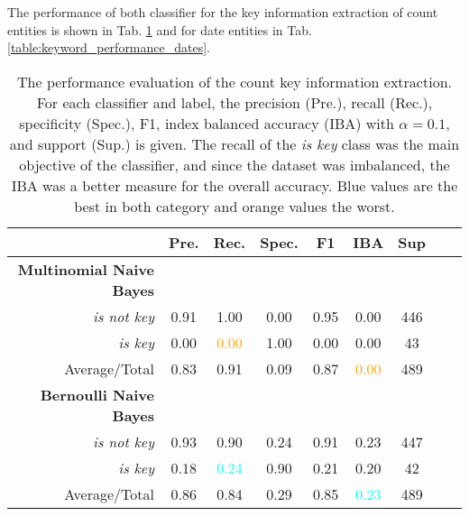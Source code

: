   The performance of both classifier for the key information extraction of count entities is shown in Tab. \ref{table:keyword_performance_counts} and for date entities in Tab. \ref{table:keyword_performance_dates}.
  \begin{table}[h!]
    \caption{The performance evaluation of the count key information extraction. For each classifier and label, the precision (Pre.), recall (Rec.), specificity (Spec.), F1, index balanced accuracy (IBA) with $\alpha = 0.1$, and support (Sup.) is given. The recall of the \textsl{is key} class was the main objective of the classifier, and since the dataset was imbalanced, the IBA was a better measure for the overall accuracy. Blue values are the best in both category and orange values the worst.}
    \centering
    \begin{tabular}{@{}rcccccccc@{}}
      \toprule
       & \textbf{Pre.} & \textbf{Rec.} & \textbf{Spec.}
      & \textbf{F1} & \textbf{IBA}& \textbf{Sup} \\
      \midrule
      \textbf{Multinomial Naive Bayes}\\
      \textsl{is not key}& 0.91& 1.00& 0.00& 0.95& 0.00& 446 \\
      \textsl{is key}& 0.00& \textcolor{orange}{0.00}& 1.00& 0.00& 0.00& 43 \\
      Average/Total& 0.83& 0.91& 0.09& 0.87& \textcolor{orange}{0.00}& 489 \vspace{2mm}\\
      \textbf{Bernoulli Naive Bayes}\\
      \textsl{is not key}& 0.93& 0.90& 0.24& 0.91& 0.23& 447 \\
      \textsl{is key}& 0.18& \textcolor{cyan}{0.24}& 0.90& 0.21& 0.20& 42 \\
      Average/Total& 0.86& 0.84& 0.29& 0.85& \textcolor{cyan}{0.23}& 489 \vspace{2mm}\\
      \bottomrule
    \end{tabular}
  \label{table:keyword_performance_counts}
  \end{table}

